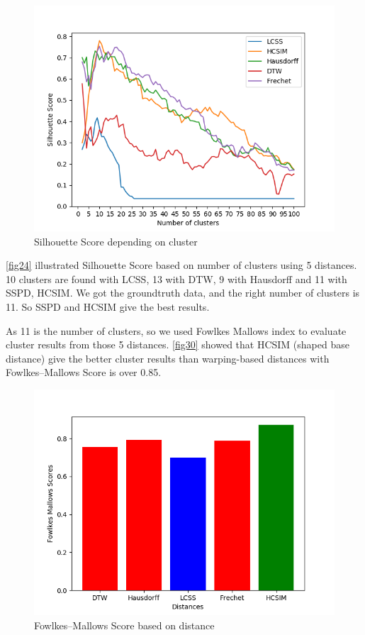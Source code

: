 \documentclass[a4paper, 12pt]{article}
\begin{document}
\begin{figure}[htbp!]
    \centering
    \includegraphics[width=1\textwidth]{distance_compare.png}
    \caption{Silhouette Score depending on cluster}
    \label{fig31}
\end{figure}

\autoref{fig24} illustrated Silhouette Score based on number of clusters using 5 distances. 10 clusters are found with LCSS, 13 with DTW, 9 with Hausdorff and 11 with SSPD, HCSIM. We got the groundtruth data, and the right number of clusters is 11. So SSPD and HCSIM give the best results.

As 11 is the number of clusters, so we used Fowlkes Mallows index to evaluate cluster results from those 5 distances. \autoref{fig30} showed that HCSIM (shaped base distance) give the better cluster results than warping-based distances with Fowlkes–Mallows Score is over 0.85.

\begin{figure}[htbp!]
    \centering
    \includegraphics[width=1\textwidth]{fowlkes_mallows_score.png}
    \caption{Fowlkes–Mallows Score based on distance}
    \label{fig32}
\end{figure}
\end{document}
